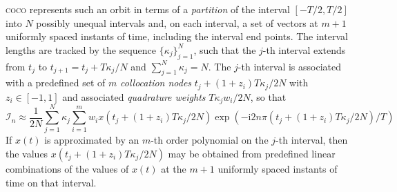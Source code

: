 \textsc{coco} represents such an orbit in terms of a \textit{partition} of the interval $[-T/2,T/2]$ into $N$ possibly unequal intervals and, on each interval, a set of vectors at $m+1$ uniformly spaced instants of time, including the interval end points. The interval lengths are tracked by the sequence $\{\kappa_j\}_{j=1}^N$, such that the $j$-th interval extends from $t_j$ to $t_{j+1}=t_j+T\kappa_j/N$ and $\sum_{j=1}^N\kappa_j=N$. The $j$-th interval is associated with a predefined set of $m$ \textit{collocation nodes} $t_j+(1+z_i)T\kappa_j/2N$ with $z_i\in[-1,1]$ and associated \textit{quadrature weights} $T\kappa_jw_i/2N$, so that
\[
\mathcal{I}_n\approx \frac{1}{2N}\sum_{j=1}^N\kappa_j\sum_{i=1}^m w_ix(t_j+(1+z_i)T\kappa_j/2N)\exp{\left(-\mathrm{i}2n\pi (t_j+(1+z_i)T\kappa_j/2N)/T\right)}
\]
If $x(t)$ is approximated by an $m$-th order polynomial on the $j$-th interval, then the values $x(t_j+(1+z_i)T\kappa_j/2N)$ may be obtained from predefined linear combinations of the values of $x(t)$ at the $m+1$ uniformly spaced instants of time on that interval.

